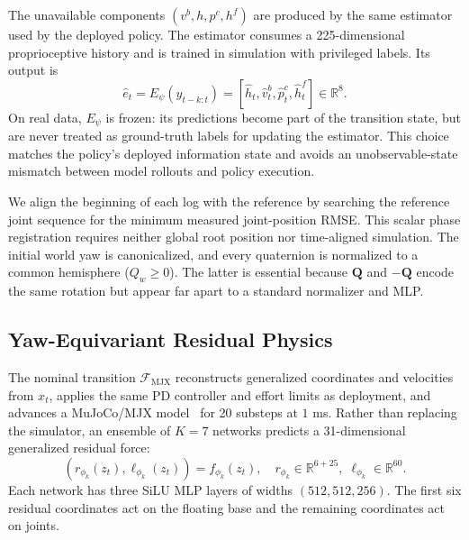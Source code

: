 \documentclass[10pt,twocolumn]{article}
\newcommand{\R}{\mathbb{R}}
\newcommand{\cF}{\mathcal{F}}
\newcommand{\quat}{\bm{Q}}
\begin{document}
The unavailable components $(v^b,h,p^c,h^f)$ are produced by the same estimator used by the deployed policy. The estimator consumes a 225-dimensional proprioceptive history and is trained in simulation with privileged labels. Its output is
\begin{equation}
\hat e_t=E_\psi(y_{t-k:t})=[\hat h_t,\hat v_t^b,\hat p_t^c,\hat h_t^f]\in\R^8.
\end{equation}
On real data, $E_\psi$ is frozen: its predictions become part of the transition state, but are never treated as ground-truth labels for updating the estimator. This choice matches the policy's deployed information state and avoids an unobservable-state mismatch between model rollouts and policy execution.

We align the beginning of each log with the reference by searching the reference joint sequence for the minimum measured joint-position RMSE. This scalar phase registration requires neither global root position nor time-aligned simulation. The initial world yaw is canonicalized, and every quaternion is normalized to a common hemisphere ($Q_w\geq0$). The latter is essential because $\quat$ and $-\quat$ encode the same rotation but appear far apart to a standard normalizer and MLP.

\subsection{Yaw-Equivariant Residual Physics}
\label{sec:residual}

The nominal transition $\cF_{\mathrm{MJX}}$ reconstructs generalized coordinates and velocities from $x_t$, applies the same PD controller and effort limits as deployment, and advances a MuJoCo/MJX model~\cite{todorov2012mujoco} for 20 substeps at $1$ ms. Rather than replacing the simulator, an ensemble of $K=7$ networks predicts a 31-dimensional generalized residual force:
\begin{equation}
(r_{\phi_k}(z_t),\ell_{\phi_k}(z_t))=f_{\phi_k}(z_t),\quad
r_{\phi_k}\in\R^{6+25},\;\ell_{\phi_k}\in\R^{60}.
\end{equation}
Each network has three SiLU MLP layers of widths $(512,512,256)$. The first six residual coordinates act on the floating base and the remaining coordinates act on joints.
\end{document}

